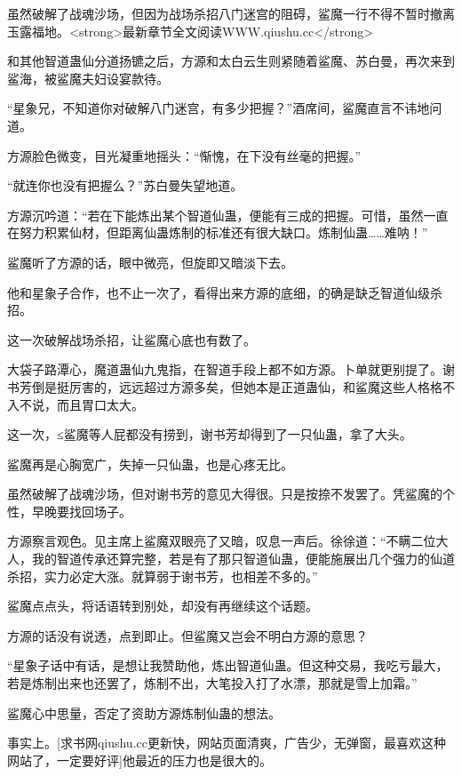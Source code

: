 
\begin{this_body}

虽然破解了战魂沙场，但因为战场杀招八门迷宫的阻碍，鲨魔一行不得不暂时撤离玉露福地。<strong>最新章节全文阅读WWW.qiushu.cc</strong>

和其他智道蛊仙分道扬镳之后，方源和太白云生则紧随着鲨魔、苏白曼，再次来到鲨海，被鲨魔夫妇设宴款待。

“星象兄，不知道你对破解八门迷宫，有多少把握？”酒席间，鲨魔直言不讳地问道。

方源脸色微变，目光凝重地摇头：“惭愧，在下没有丝毫的把握。”

“就连你也没有把握么？”苏白曼失望地道。

方源沉吟道：“若在下能炼出某个智道仙蛊，便能有三成的把握。可惜，虽然一直在努力积累仙材，但距离仙蛊炼制的标准还有很大缺口。炼制仙蛊……难呐！”

鲨魔听了方源的话，眼中微亮，但旋即又暗淡下去。

他和星象子合作，也不止一次了，看得出来方源的底细，的确是缺乏智道仙级杀招。

这一次破解战场杀招，让鲨魔心底也有数了。

大袋子路潭心，魔道蛊仙九鬼指，在智道手段上都不如方源。卜单就更别提了。谢书芳倒是挺厉害的，远远超过方源多矣，但她本是正道蛊仙，和鲨魔这些人格格不入不说，而且胃口太大。

这一次，≤鲨魔等人屁都没有捞到，谢书芳却得到了一只仙蛊，拿了大头。

鲨魔再是心胸宽广，失掉一只仙蛊，也是心疼无比。

虽然破解了战魂沙场，但对谢书芳的意见大得很。只是按捺不发罢了。凭鲨魔的个性，早晚要找回场子。

方源察言观色。见主席上鲨魔双眼亮了又暗，叹息一声后。徐徐道：“不瞒二位大人，我的智道传承还算完整，若是有了那只智道仙蛊，便能施展出几个强力的仙道杀招，实力必定大涨。就算弱于谢书芳，也相差不多的。”

鲨魔点点头，将话语转到别处，却没有再继续这个话题。

方源的话没有说透，点到即止。但鲨魔又岂会不明白方源的意思？

“星象子话中有话，是想让我赞助他，炼出智道仙蛊。但这种交易，我吃亏最大，若是炼制出来也还罢了，炼制不出，大笔投入打了水漂，那就是雪上加霜。”

鲨魔心中思量，否定了资助方源炼制仙蛊的想法。

事实上。[求书网qiushu.cc更新快，网站页面清爽，广告少，无弹窗，最喜欢这种网站了，一定要好评]他最近的压力也是很大的。


\end{this_body}
